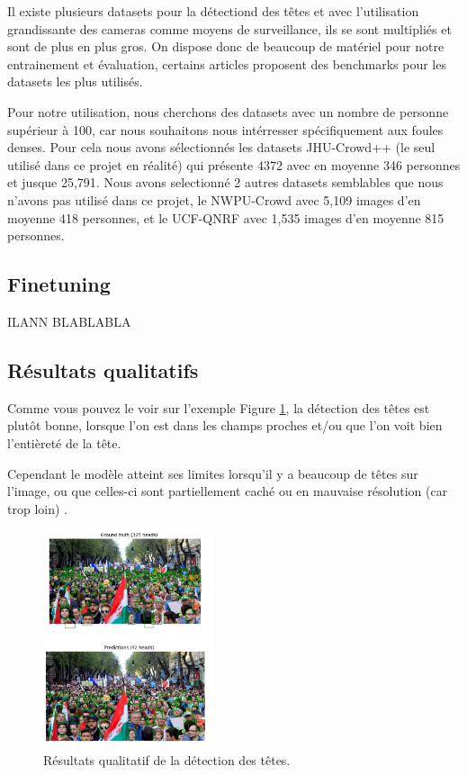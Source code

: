 Il existe plusieurs datasets pour la détectiond des têtes et avec l'utilisation grandissante des cameras comme moyens de surveillance, ils se sont multipliés et sont de plus en plus gros. On dispose donc de beaucoup de matériel pour notre entrainement et évaluation, certains articles \cite{state_of_the_art_datasets} proposent des benchmarks pour les datasets les plus utilisés.

Pour notre utilisation, nous cherchons des datasets avec un nombre de personne supérieur à 100, car nous souhaitons nous intérresser spécifiquement aux foules denses. Pour cela nous avons sélectionnés les datasets JHU-Crowd++ \cite{sindagi2020jhu-crowd++} (le seul utilisé dans ce projet en réalité) qui présente 4372 avec en moyenne 346 personnes et jusque 25,791.
Nous avons selectionné 2 autres datasets semblables que nous n'avons pas utilisé dans ce projet, le NWPU-Crowd \cite{gao2020nwpu} avec 5,109 images d'en moyenne 418 personnes, et le UCF-QNRF \cite{idress2018ucfqnrf} avec 1,535 images d'en moyenne 815 personnes.

\subsection{Finetuning}

ILANN BLABLABLA

\subsection{Résultats qualitatifs}

Comme vous pouvez le voir sur l'exemple Figure \ref{fig:heads-detection}, la détection des têtes est plutôt bonne, lorsque l'on est dans les champs proches et/ou que l'on voit bien l'entièreté de la tête.

Cependant le modèle atteint ses limites lorsqu'il y a beaucoup de têtes sur l'image, ou que celles-ci sont partiellement caché ou en mauvaise résolution (car trop loin)
.
\begin{figure}[h!]
    \centering
    \includegraphics[width=0.45\textwidth]{images/heads_detection.png}
    \caption{Résultats qualitatif de la détection des têtes.}
    \label{fig:heads-detection}
\end{figure}
